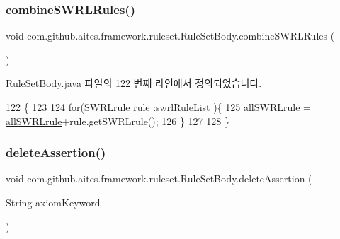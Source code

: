 \subsubsection{\texorpdfstring{combine\+S\+W\+R\+L\+Rules()}{combineSWRLRules()}}
{\footnotesize\ttfamily void com.\+github.\+aites.\+framework.\+ruleset.\+Rule\+Set\+Body.\+combine\+S\+W\+R\+L\+Rules (\begin{DoxyParamCaption}{ }\end{DoxyParamCaption})\hspace{0.3cm}{\ttfamily [private]}}



Rule\+Set\+Body.\+java 파일의 122 번째 라인에서 정의되었습니다.


\begin{DoxyCode}
122                                    \{
123         
124         \textcolor{keywordflow}{for}(SWRLrule rule :\mbox{\hyperlink{classcom_1_1github_1_1aites_1_1framework_1_1ruleset_1_1_rule_set_body_aa0c93dd6d2a58be027c0d55f742d0b64}{swrlRuleList}} )\{
125             \mbox{\hyperlink{classcom_1_1github_1_1aites_1_1framework_1_1ruleset_1_1_rule_set_body_aa658ea44f4d978fc5964ab0f1b5ea96c}{allSWRLrule}} = \mbox{\hyperlink{classcom_1_1github_1_1aites_1_1framework_1_1ruleset_1_1_rule_set_body_aa658ea44f4d978fc5964ab0f1b5ea96c}{allSWRLrule}}+rule.getSWRLrule();
126         \}
127         
128     \}
\end{DoxyCode}
\mbox{\label{classcom_1_1github_1_1aites_1_1framework_1_1ruleset_1_1_rule_set_body_a966a05a55349d58f1ca2d56a423f1370}} 
\subsubsection{\texorpdfstring{delete\+Assertion()}{deleteAssertion()}}
{\footnotesize\ttfamily void com.\+github.\+aites.\+framework.\+ruleset.\+Rule\+Set\+Body.\+delete\+Assertion (\begin{DoxyParamCaption}\item[{String}]{axiom\+Keyword }\end{DoxyParamCaption})}



